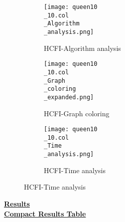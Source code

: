 \documentclass[10pt]{article}
\begin{document}
\graphicspath{{./Core1/Solutions/HCFI/queen10\_10.col}}
\begin{figure}[H]
\begin{subfigure}{.33\textwidth}
  \centering
  \texttt{[image: queen10\\\_10.col\\\_Algorithm\\\_analysis.png]}
  \caption{HCFI-Algorithm analysis}
   \label{fig:subfig1}
\end{subfigure}%
\begin{subfigure}{.33\textwidth}
  \centering
  \texttt{[image: queen10\\\_10.col\\\_Graph\\\_coloring\\\_expanded.png]}
  \caption{HCFI-Graph coloring}
  \label{fig:subfig2}
\end{subfigure}
\begin{subfigure}{.33\textwidth}
  \centering
  \texttt{[image: queen10\\\_10.col\\\_Time\\\_analysis.png]}
  \caption{HCFI-Time analysis}
  \end{subfigure}
\end{figure}
\vspace{2cm}
\begin{center}
\hyperlink{page.8}{\textbf{Results}}\\
\vspace{0.5cm}
\hyperlink{page.71}{\textbf{Compact Results Table}}
\end{center}
\pagebreak
\end{document}
